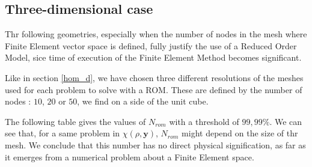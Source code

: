 \subsection{Three-dimensional case}

Thr following geometries, especially when the number of nodes in the mesh where Finite Element vector space is defined, fully justify the use of a Reduced Order Model, %
sice time of execution of the Finite Element Method becomes significant.

\par
Like in section \ref{hom_d}, we have chosen three different resolutions of the meshes used for each problem to solve with a ROM. %
These are defined by the number of nodes : $10$, $20$ or $50$, we find on a side of the unit cube.

\par
The following table gives the values of $N_{rom}$ with a threshold of $99,99\%$. We can see that, for a same problem in $\chi (\rho ,\mathbf{y})$, %
$N_{rom}$ might depend on the size of thr mesh. %
We conclude that this number has no direct physical signification, %
as far as it emerges from a numerical problem about a Finite Element space.

